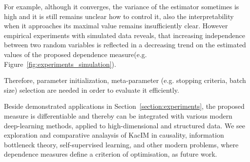 \documentclass{article}
\begin{document}
For example, although it converges, the variance of the estimator sometimes is high and it is still remains unclear how to control it, also the interpretability when it approaches its maximal value remains insufficiently clear. However empirical experiments with simulated data reveals, that increasing independence between two random variables is reflected in a decreasing trend on the estimated values of the proposed dependence measure(e.g. Figure~\ref{fig:experiments_simulation}). 

 Therefore, parameter initialization, meta-parameter (e.g. stopping criteria, batch size) selection are needed in order to evaluate it efficiently.

Beside demonstrated applications in Section~\ref{section:experiments}, the proposed measure is differentiable and thereby can be integrated with various modern deep-learning methods, applied to high-dimensional and structured data. We see exploration and comparative analaysis of KacIM in causality, information bottleneck theory, self-supervised learning, and other modern problems, where dependence measures define a criterion of optimisation, as future work. %
\end{document}
